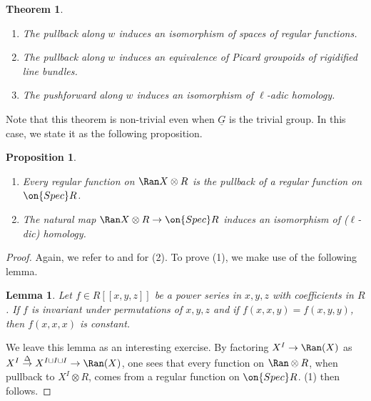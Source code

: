 \documentclass[]{pcmi}
\theoremstyle{plain}
\newtheorem{thm}[equation]{Theorem}
\newtheorem{prop}[equation]{Proposition}
\newtheorem{lem}[equation]{Lemma}
\theoremstyle{remark}
\theoremstyle{definition}
\newcommand{\Spec}{\on{Spec}}
\begin{document}
\begin{thm}\label{Ran=Rat}~
\begin{enumerate}
\item[(1)] The pullback along $w$ induces an isomorphism of spaces of regular functions. 
\item[(2)] The pullback along $w$ induces an equivalence of Picard groupoids of rigidified line bundles. 
\item[(3)] The pushforward along $w$ induces an isomorphism of $\ell$-adic homology.
\end{enumerate}
\end{thm}

Note that this theorem is non-trivial even when $\underline G$ is the trivial group. In this case, we state it as  the following proposition.
\begin{prop}\label{Ran pt}~
\begin{enumerate}
\item[(1)] Every regular function on $\Ran X\otimes R$ is the pullback of a regular function on $\Spec R$.
\item[(2)] The natural map $\Ran X\otimes R\to \Spec R$ induces an isomorphism of ($\ell$-dic) homology. 
\end{enumerate}
\end{prop}
\begin{proof}
Again, we refer to \cite{Ga3} and \cite[\S~2]{GL} for (2). 
To prove (1), we make use of the following lemma.
\begin{lem}
Let $f\in R[[x,y,z]]$ be a power series in $x,y,z$ with coefficients in $R$. If $f$ is invariant under permutations of $x,y,z$ and if $f(x,x,y)=f(x,y,y)$, then $f(x,x,x)$ is constant.
\end{lem}
We leave this lemma as an interesting exercise. By factoring $X^I\to \Ran(X)$ as $X^I\stackrel{\Delta}{\to} X^{I\sqcup I\sqcup I}\to \Ran(X)$, one sees that every function on $\Ran\otimes R$, when pullback to $X^I\otimes R$, comes from a regular function on $\Spec R$. (1) then follows.
\end{proof}
\end{document}
